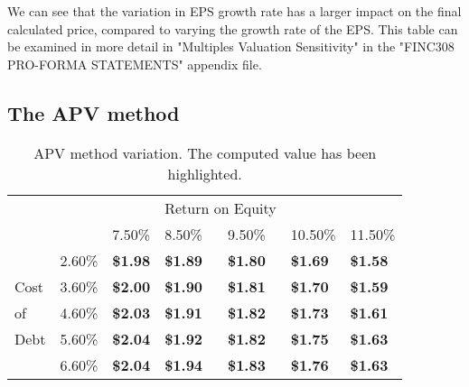 \documentclass{article}
\begin{document}
We can see that the variation in EPS growth rate has a larger impact on the final calculated price, compared to varying the growth rate of the EPS. This table can be examined in more detail in "Multiples Valuation Sensitivity" in the "FINC308 PRO-FORMA STATEMENTS" appendix file.

\newpage
\subsection{The APV method}

\begin{table}[h]
\begin{tabular}{lllllll}
                          &                             &                                      & \multicolumn{2}{l}{Return on Equity}                                                                &                                      &                                      \\ \cline{2-7} 
\multicolumn{1}{l|}{}     & \multicolumn{1}{l|}{}       & \multicolumn{1}{l|}{7.50\%}          & \multicolumn{1}{l|}{8.50\%}          & \multicolumn{1}{l|}{9.50\%}                                  & \multicolumn{1}{l|}{10.50\%}         & \multicolumn{1}{l|}{11.50\%}         \\ \cline{2-7} 
\multicolumn{1}{l|}{}     & \multicolumn{1}{l|}{2.60\%} & \multicolumn{1}{l|}{\textbf{\$1.98}} & \multicolumn{1}{l|}{\textbf{\$1.89}} & \multicolumn{1}{l|}{\textbf{\$1.80}}                         & \multicolumn{1}{l|}{\textbf{\$1.69}} & \multicolumn{1}{l|}{\textbf{\$1.58}} \\ \cline{2-7} 
\multicolumn{1}{l|}{Cost} & \multicolumn{1}{l|}{3.60\%} & \multicolumn{1}{l|}{\textbf{\$2.00}} & \multicolumn{1}{l|}{\textbf{\$1.90}} & \multicolumn{1}{l|}{\textbf{\$1.81}}                         & \multicolumn{1}{l|}{\textbf{\$1.70}} & \multicolumn{1}{l|}{\textbf{\$1.59}} \\ \cline{2-7} 
\multicolumn{1}{l|}{of}   & \multicolumn{1}{l|}{4.60\%} & \multicolumn{1}{l|}{\textbf{\$2.03}} & \multicolumn{1}{l|}{\textbf{\$1.91}} & \multicolumn{1}{l|}{\cellcolor[HTML]{F8FF00}\textbf{\$1.82}} & \multicolumn{1}{l|}{\textbf{\$1.73}} & \multicolumn{1}{l|}{\textbf{\$1.61}} \\ \cline{2-7} 
\multicolumn{1}{l|}{Debt} & \multicolumn{1}{l|}{5.60\%} & \multicolumn{1}{l|}{\textbf{\$2.04}} & \multicolumn{1}{l|}{\textbf{\$1.92}} & \multicolumn{1}{l|}{\textbf{\$1.82}}                         & \multicolumn{1}{l|}{\textbf{\$1.75}} & \multicolumn{1}{l|}{\textbf{\$1.63}} \\ \cline{2-7} 
\multicolumn{1}{l|}{}     & \multicolumn{1}{l|}{6.60\%} & \multicolumn{1}{l|}{\textbf{\$2.04}} & \multicolumn{1}{l|}{\textbf{\$1.94}} & \multicolumn{1}{l|}{\textbf{\$1.83}}                         & \multicolumn{1}{l|}{\textbf{\$1.76}} & \multicolumn{1}{l|}{\textbf{\$1.63}} \\ \cline{2-7} 
\end{tabular}
\caption{APV method variation. The computed value has been highlighted.}
\label{tab:apv_val}
\end{table}
\end{document}
